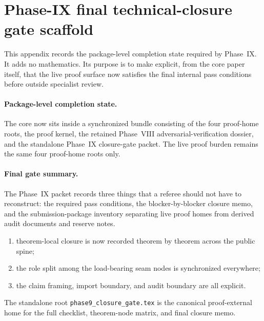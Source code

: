 \section{Phase-IX final technical-closure gate scaffold}\label{app:phase9-closure-gate}

This appendix records the package-level completion state required by Phase~IX. It adds no mathematics. Its purpose is to make explicit, from the core paper itself, that the live proof surface now satisfies the final internal pass conditions before outside specialist review.

\paragraph{Package-level completion state.}
The core now sits inside a synchronized bundle consisting of the four proof-home roots, the proof kernel, the retained Phase~VIII adversarial-verification dossier, and the standalone Phase~IX closure-gate packet. The live proof burden remains the same four proof-home roots only.

\paragraph{Final gate summary.}
The Phase~IX packet records three things that a referee should not have to reconstruct: the required pass conditions, the blocker-by-blocker closure memo, and the submission-package inventory separating live proof homes from derived audit documents and reserve notes.

\begin{enumerate}[leftmargin=2.2em,label=\textup{(\roman*)}]
\item theorem-local closure is now recorded theorem by theorem across the public spine;
\item the role split among the load-bearing seam nodes is synchronized everywhere;
\item the claim framing, import boundary, and audit boundary are all explicit.
\end{enumerate}

The standalone root \texttt{phase9\_closure\_gate.tex} is the canonical proof-external home for the full checklist, theorem-node matrix, and final closure memo.
